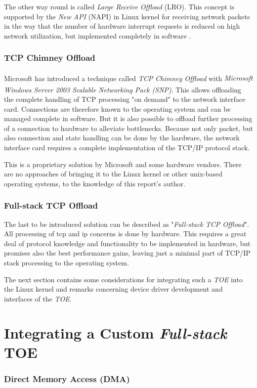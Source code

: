 The other way round is called \textit{Large Receive Offload} (LRO). This concept is supported by the \textit{New API} (NAPI) in Linux kernel for receiving network packets in the way that the number of hardware interrupt requests is reduced on high network utilization, but implemented completely in software \cite{linux-lro}.
\\

\subsubsection{TCP Chimney Offload}

Microsoft has introduced a technique called \textit{TCP Chimney Offload} with \textit{Microsoft\textsuperscript{\textregistered} Windows Server\textsuperscript{\textregistered} 2003 Scalable Networking Pack (SNP)}. This allows offloading the complete handling of TCP processing "on demand" to the network interface card. Connections are therefore known to the operating system and can be managed complete in software. But it is also possible to offload further processing of a connection to hardware to alleviate bottlenecks. Because not only packet, but also connection and state handling can be done by the hardware, the network interface card requires a complete implementation of the TCP/IP protocol stack. \cite{dell-toe}

This is a proprietary solution by Microsoft and some hardware vendors. There are no approaches of bringing it to the Linux kernel or other unix-based operating systems, to the knowledge of this report's author.
\\

\subsubsection{Full-stack TCP Offload}

The last to be introduced solution can be described as "\textit{Full-stack TCP Offload}". All processing of \gls{tcp} and \gls{ip} concerns is done by hardware. This requires a great deal of protocol knowledge and functionality to be implemented in hardware, but promises also the best performance gains, leaving just a minimal part of TCP/IP stack processing to the operating system.

The next section contains some considerations for integrating such a \textit{TOE} into the Linux kernel and remarks concerning device driver development and interfaces of the \textit{TOE}.
\\

\section{Integrating a Custom \textit{Full-stack} TOE}

\subsubsection{Direct Memory Access (DMA)}